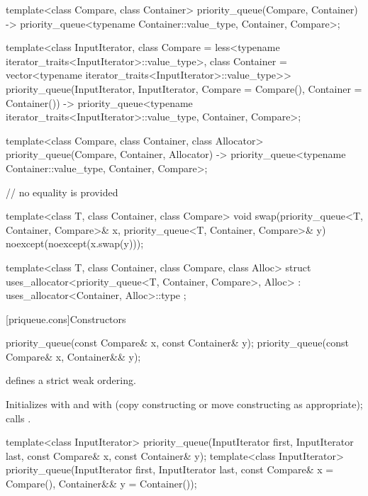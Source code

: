 \begin{codeblock}
{  template<class Compare, class Container>
    priority_queue(Compare, Container)
      -> priority_queue<typename Container::value_type, Container, Compare>;

  template<class InputIterator,
           class Compare = less<typename iterator_traits<InputIterator>::value_type>,
           class Container = vector<typename iterator_traits<InputIterator>::value_type>>
    priority_queue(InputIterator, InputIterator, Compare = Compare(), Container = Container())
      -> priority_queue<typename iterator_traits<InputIterator>::value_type, Container, Compare>;

  template<class Compare, class Container, class Allocator>
    priority_queue(Compare, Container, Allocator)
      -> priority_queue<typename Container::value_type, Container, Compare>;

  // no equality is provided

  template<class T, class Container, class Compare>
    void swap(priority_queue<T, Container, Compare>& x,
              priority_queue<T, Container, Compare>& y) noexcept(noexcept(x.swap(y)));

  template<class T, class Container, class Compare, class Alloc>
    struct uses_allocator<priority_queue<T, Container, Compare>, Alloc>
      : uses_allocator<Container, Alloc>::type { };
}
\end{codeblock}

[priqueue.cons]{Constructors}

%
\begin{itemdecl}
priority_queue(const Compare& x, const Container& y);
priority_queue(const Compare& x, Container&& y);
\end{itemdecl}

\begin{itemdescr}
\pnum
\expects
{} defines a strict weak ordering.

\pnum
\effects
Initializes
 with
 and
 with
 (copy constructing or move constructing as appropriate);
calls
.
\end{itemdescr}

%
\begin{itemdecl}
template<class InputIterator>
  priority_queue(InputIterator first, InputIterator last, const Compare& x, const Container& y);
template<class InputIterator>
  priority_queue(InputIterator first, InputIterator last, const Compare& x = Compare(),
                 Container&& y = Container());
\end{itemdecl}

